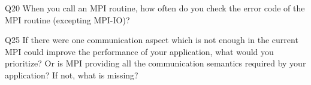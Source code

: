 \begin{description}%
\item{Q20} When you call an MPI routine, how often do you check the error code of the MPI routine  (excepting MPI-IO)?%
\item{Q25} If there were one communication aspect which is not enough in the current MPI could improve the performance of your application, what would you prioritize? Or is MPI providing all the communication semantics required by your application? If not, what is missing?%
\end{description}%
